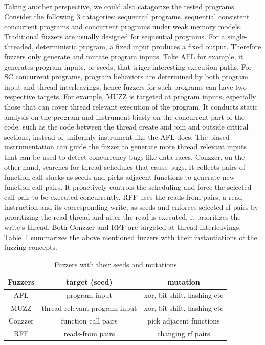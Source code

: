Taking another perspective, we could also catagorize the tested programs. Consider the following 3 catagories: sequentail programs, sequential consistent concurrent programs and concurrent programs under weak memory models. Traditional fuzzers are usually designed for sequential programs. For a single-threaded, deterministic program, a fixed input produces a fixed output. Therefore fuzzers only generate and mutate program inputs. Take AFL for example, it generates program inputs, or seeds, that triger interesting execution paths. For SC concurrent programs, program behaviors are determined by both program input and thread interleavings, hence fuzzers for such programs can have two respective targets. For example, MUZZ\cite{muzz} is targeted at program inputs, especially those that can cover thread relevant execution of the program. It conducts static analysis on the program and instrument biasly on the concurrent part of the code, such as the code between the thread create and join and outside critical sections, instead of uniformly instrument like the AFL does. The biased instrumentation can guide the fuzzer to generate more thread relevant inputs that can be used to detect concurrency bugs like data races. Conzzer\cite{conzzer}, on the other hand, searches for thread schedules that cause bugs. It collects pairs of function call stacks as seeds and picks adjacent functions to generate new function call pairs. It proactively controls the scheduling and force the selected call pair to be executed concurrently. RFF\cite{rff} uses the reads-from pairs, a read instruction and its corresponding write, as seeds and enforces selected rf pairs by prioritizing the read thread and after the read is executed, it prioritizes the write's thread. Both Conzzer and RFF are targeted at thread interleavings. Table~\ref{fuzzer-concepts} summarizes the above mentioned fuzzers with their instantiations of the fuzzing concepts.


\begin{table}[h!]
	\centering
	\begin{tabular}{ |c|cc| }
		\hline
		Fuzzers  & target (seed) & mutation    \\ 
        \hline
        AFL & program input &  xor, bit shift, hashing etc  \\ 
        MUZZ & thread-relevant program input & xor, bit shift, hashing etc  \\
        Conzzer & function call pairs   & pick adjacent functions \\
        RFF & reads-from pairs & changing rf pairs\\
        
		\hline
	\end{tabular}
	\caption{Fuzzers with their seeds and mutations}
	\label{fuzzer-concepts}
\end{table}


